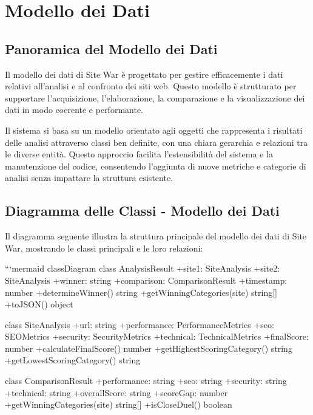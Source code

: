 \chapter{Modello dei Dati}

\section{Panoramica del Modello dei Dati}
Il modello dei dati di Site War è progettato per gestire efficacemente i dati relativi all'analisi e al confronto dei siti web. Questo modello è strutturato per supportare l'acquisizione, l'elaborazione, la comparazione e la visualizzazione dei dati in modo coerente e performante.

Il sistema si basa su un modello orientato agli oggetti che rappresenta i risultati delle analisi attraverso classi ben definite, con una chiara gerarchia e relazioni tra le diverse entità. Questo approccio facilita l'estensibilità del sistema e la manutenzione del codice, consentendo l'aggiunta di nuove metriche e categorie di analisi senza impattare la struttura esistente.

\section{Diagramma delle Classi - Modello dei Dati}

Il diagramma seguente illustra la struttura principale del modello dei dati di Site War, mostrando le classi principali e le loro relazioni:

```mermaid
classDiagram
    class AnalysisResult {
        +site1: SiteAnalysis
        +site2: SiteAnalysis
        +winner: string
        +comparison: ComparisonResult
        +timestamp: number
        +determineWinner() string
        +getWinningCategories(site) string[]
        +toJSON() object
    }
    
    class SiteAnalysis {
        +url: string
        +performance: PerformanceMetrics
        +seo: SEOMetrics
        +security: SecurityMetrics
        +technical: TechnicalMetrics
        +finalScore: number
        +calculateFinalScore() number
        +getHighestScoringCategory() string
        +getLowestScoringCategory() string
    }
    
    class ComparisonResult {
        +performance: string
        +seo: string
        +security: string
        +technical: string
        +overallScore: string
        +scoreGap: number
        +getWinningCategories(site) string[]
        +isCloseDuel() boolean
    }
    
